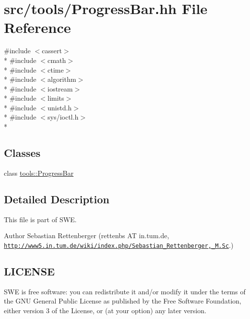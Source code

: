 \hypertarget{ProgressBar_8hh}{\section{src/tools/\-Progress\-Bar.hh File Reference}
\label{ProgressBar_8hh}
}
{\ttfamily \#include $<$cassert$>$}\\*
{\ttfamily \#include $<$cmath$>$}\\*
{\ttfamily \#include $<$ctime$>$}\\*
{\ttfamily \#include $<$algorithm$>$}\\*
{\ttfamily \#include $<$iostream$>$}\\*
{\ttfamily \#include $<$limits$>$}\\*
{\ttfamily \#include $<$unistd.\-h$>$}\\*
{\ttfamily \#include $<$sys/ioctl.\-h$>$}\\*
\subsection*{Classes}
\begin{DoxyCompactItemize}
\item 
class \hyperlink{classtools_1_1ProgressBar}{tools\-::\-Progress\-Bar}
\end{DoxyCompactItemize}


\subsection{Detailed Description}
This file is part of S\-W\-E.

\begin{DoxyAuthor}{Author}
Sebastian Rettenberger (rettenbs A\-T in.\-tum.\-de, \href{http://www5.in.tum.de/wiki/index.php/Sebastian_Rettenberger,_M.Sc}{\tt http\-://www5.\-in.\-tum.\-de/wiki/index.\-php/\-Sebastian\-\_\-\-Rettenberger,\-\_\-\-M.\-Sc}.)
\end{DoxyAuthor}
\hypertarget{Writer_8hh_LICENSE}{}\subsection{L\-I\-C\-E\-N\-S\-E}\label{Writer_8hh_LICENSE}
S\-W\-E is free software\-: you can redistribute it and/or modify it under the terms of the G\-N\-U General Public License as published by the Free Software Foundation, either version 3 of the License, or (at your option) any later version.

